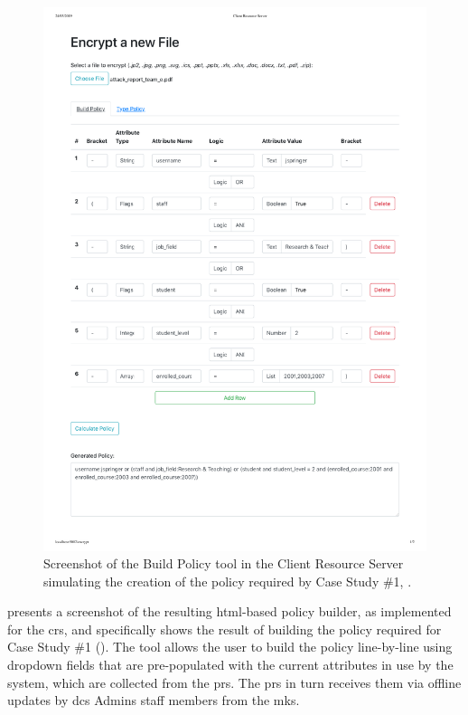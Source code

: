 \begin{figure}[htp]
    \centering
    \includegraphics[width=\linewidth,keepaspectratio]{appendices/building_policy.pdf}

    \caption{
      \label{fig:policy_builder}
      Screenshot of the Build Policy tool in the Client Resource Server simulating the creation of the policy required by Case Study \#1, .
    }

\end{figure}

 presents a screenshot of the resulting \acrshort{html}-based policy builder, as implemented for the \acrshort{crs}, and specifically shows the result of building the policy required for Case Study \#1 (). The tool allows the user to build the policy line-by-line using dropdown fields that are pre-populated with the current attributes in use by the \theResServer system, which are collected from the \acrshort{prs}. The \acrshort{prs} in turn receives them via offline updates by \acrshort{dcs} Admins staff members from the \acrshort{mks}.

